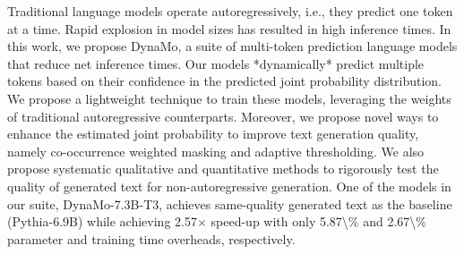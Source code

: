Traditional language models operate autoregressively, i.e., they predict one token at a time. Rapid explosion in model  sizes has resulted in high inference times. In this work, we propose DynaMo, a suite of multi-token prediction language  models that reduce net inference times. Our models *dynamically* predict  multiple tokens based on their confidence in the predicted joint probability distribution. We propose a lightweight technique to train these models, leveraging the weights of traditional autoregressive counterparts. Moreover, we propose novel  ways to enhance the estimated joint probability to improve text generation quality, namely co-occurrence weighted masking  and adaptive thresholding. We also propose systematic qualitative and quantitative methods to rigorously test the quality of  generated text for non-autoregressive generation. One of the models in our suite, DynaMo-7.3B-T3, achieves same-quality  generated text as the baseline (Pythia-6.9B) while achieving 2.57$\times$ speed-up with only 5.87\textbackslash{}\% and 2.67\textbackslash{}\% parameter and training time  overheads, respectively.
